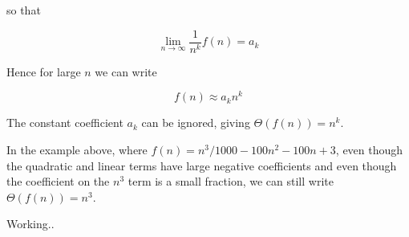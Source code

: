 \documentclass[a4paper,12pt]{article}
\begin{document}
so that

\[ \lim_{n \rightarrow \infty} \frac{1}{n^k}f(n) = a_k \]

Hence for large $n$ we can write

\[ f(n) \approx a_k n^k \]

The constant coefficient $a_k$ can be ignored, giving $\Theta(f(n)) = n^k$.

In the example above, where $f(n) = n^3/1000 - 100n^2 - 100n + 3$, even though the quadratic and linear
terms have large negative coefficients and even though the coefficient on the $n^3$ term is a small fraction,
we can still write $\Theta(f(n)) = n^3$.

\vspace{5mm}


Working..
\end{document}
